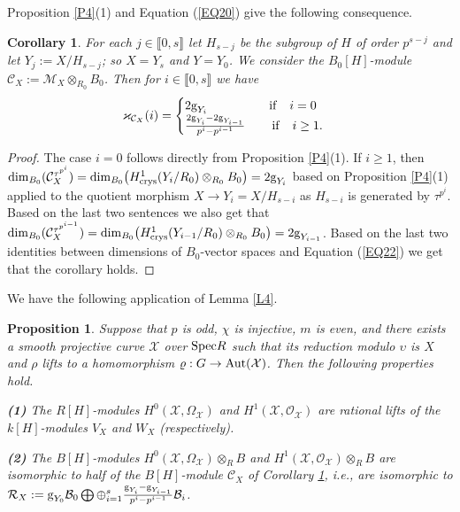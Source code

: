 \documentclass[11pt]{amsart}
\newtheorem{proposition}[theorem]{Proposition}
\newtheorem{corollary}[theorem]{Corollary}
\def\Aut{\textup{Aut}}
\def\crys{\textup{crys}}
\def\Spec{\textup{Spec}}
\begin{document}
\smallskip
Proposition \ref{P4}(1) and Equation (\ref{EQ20}) give the following consequence.

\begin{corollary}\label{C4}
For each $j\in\llbracket0,s\rrbracket$ let $H_{s-j}$ be the subgroup of $H$ of order $p^{s-j}$ and let $Y_j:=X/H_{s-j}$; so $X=Y_s$ and $Y=Y_0$. We consider the $B_0[H]$-module $\mathcal C_X:=\mathcal M_X\otimes_{R_0} B_0$. Then for $i\in\llbracket0,s\rrbracket$ we have
$$\varkappa_{\mathcal C_X}(i)=\begin{cases} 2\textup{g}_{Y_i}\quad\quad\quad\quad\quad {\rm if}\quad i=0\\
\frac{2\textup{g}_{Y_i}-2\textup{g}_{Y_{i-1}}}{p^i-p^{i-1}}\quad\,\;\;\;\, {\rm if}\quad i\ge 1.\end{cases}$$
\end{corollary}

\begin{proof}
The case $i=0$ follows directly from Proposition \ref{P4}(1). If $i\ge 1$, then $\dim_{B_0}(\mathcal C_X^{\tau^{p^i}})=\dim_{B_0}\bigl(H^1_{\crys}(Y_i/R_0)\otimes_{R_0} B_0\bigr)=2\textup{g}_{Y_i}$ based on Proposition \ref{P4}(1) applied to the quotient morphism $X\rightarrow Y_i=X/H_{s-i}$ as $H_{s-i}$ is generated by $\tau^{p^i}$. Based on the last two sentences we also get that $\dim_{B_0}(\mathcal C_X^{\tau^{p^{i-1}}})=\dim_{B_0}\bigl(H^1_{\crys}(Y_{i-1}/R_0)\otimes_{R_0} B_0\bigr)=2\textup{g}_{Y_{i-1}}$. Based on the last two identities between dimensions of $B_0$-vector spaces and Equation (\ref{EQ22}) we get that the corollary holds.
\end{proof}

\smallskip
We have the following application of Lemma \ref{L4}.

\begin{proposition}\label{P5}
Suppose that $p$ is odd, $\chi$ is injective, $m$ is even, and there exists a smooth projective curve $\mathcal X$ over $\Spec R$ such that its reduction modulo $\upsilon$ is $X$ and $\rho$ lifts to a homomorphism $\varrho:G\rightarrow\Aut(\mathcal X)$. Then the following properties hold.

\medskip
{\bf (1)} The $R[H]$-modules $H^0(\mathcal X,\Omega_{\mathcal X})$ and $H^1(\mathcal X,\mathcal O_{\mathcal X})$ are rational lifts of the $k[H]$-modules $V_X$ and $W_X$ (respectively).

\smallskip
{\bf (2)} The $B[H]$-modules $H^0(\mathcal X,\Omega_{\mathcal X})\otimes_R B$ and $H^1(\mathcal X,\mathcal O_{\mathcal X})\otimes_R B$ are isomorphic to half of the $B[H]$-module $\mathcal C_X$ of Corollary \ref{C4}, i.e., are isomorphic to $\mathcal R_X:=\textup{g}_{Y_0}\mathcal B_0\bigoplus\oplus_{i=1}^s \frac{\textup{g}_{Y_i}-\textup{g}_{Y_{i-1}}}{p^i-p^{i-1}}\mathcal B_i$.
\end{proposition}
\end{document}
